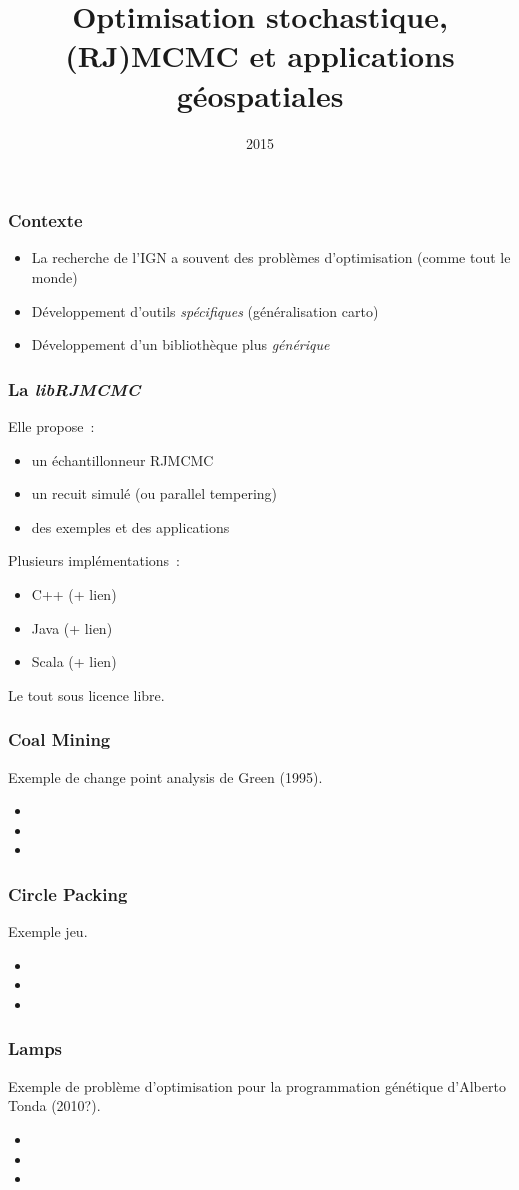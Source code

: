 \documentclass{beamer}
\title{Optimisation stochastique, (RJ)MCMC et applications g\'eospatiales}
\author{}
\institute{IGN}
\date{2015}
\begin{document}
\frame{\titlepage}
 
\begin{frame}
\frametitle{Contexte}
\begin{itemize}
\item La recherche de l'IGN a souvent des probl\`emes d'optimisation (comme tout le monde)
\item D\'eveloppement d'outils \emph{sp\'ecifiques} (g\'en\'eralisation carto)
\item D\'eveloppement d'un biblioth\`eque plus \emph{g\'en\'erique}
\end{itemize}
\end{frame}

\begin{frame}
\frametitle{La \emph{libRJMCMC}}
Elle propose~:
\begin{itemize}
\item un \'echantillonneur RJMCMC
\item un recuit simul\'e (ou parallel tempering)
\item des exemples et des applications
\end{itemize}
Plusieurs impl\'ementations~:
\begin{itemize}
\item C++ (+ lien)
\item Java (+ lien)
\item Scala (+ lien)
\end{itemize}
Le tout sous licence libre.
\end{frame}

\begin{frame}
\frametitle{Coal Mining}
Exemple de change point analysis de Green (1995).
\begin{itemize}
\item 
\item 
\item 
\end{itemize}
\end{frame}

\begin{frame}
\frametitle{Circle Packing}
Exemple jeu.
\begin{itemize}
\item 
\item 
\item 
\end{itemize}
\end{frame}

\begin{frame}
\frametitle{Lamps}
Exemple de problème d'optimisation pour la programmation génétique d'Alberto Tonda (2010?).
\begin{itemize}
\item 
\item 
\item 
\end{itemize}
\end{frame}
\end{document}
